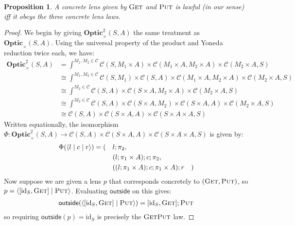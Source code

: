 \documentclass[11pt,letterpaper]{article}
\theoremstyle{plain}
\newtheorem{proposition}[theorem]{Proposition}
\theoremstyle{definition}
\newcommand{\C}{\mathscr{C}}
\newcommand{\Optic}{\mathbf{Optic}}
\newcommand{\Twoptic}{\mathbf{Optic}^2}
\newcommand{\conctwice}{\mathbb{C}^2}
\newcommand{\id}{\mathrm{id}}
\newcommand{\rep}[2]{{\ensuremath \left\langle #1 \mid #2 \right\rangle}}
\newcommand{\repthree}[3]{{\ensuremath \langle #1 \mid #2 \mid #3 \rangle}}
\newcommand{\fget}{\textsc{Get}}
\newcommand{\fput}{\textsc{Put}}
\newcommand{\outside}{\mathsf{outside}}
\begin{document}
\begin{proposition}\label{prop:lawful-lens-laws}
  A concrete lens given by $\fget$ and $\fput$ is lawful (in our sense) iff it obeys the three concrete lens laws.
\end{proposition}
\begin{proof}
  We begin by giving $\Twoptic_\times(S, A)$ the same treatment as $\Optic_\times(S, A)$. Using the universal property of the product and Yoneda reduction twice each, we have:
  \begin{align*}
  \Twoptic_\times(S, A)
  &= \int^{M_1, M_2 \in \C} \C(S, M_1 \times A) \times \C(M_1 \times A, M_2 \times A) \times \C(M_2 \times A, S) \\
  &\cong \int^{M_1, M_2 \in \C} \C(S, M_1) \times \C(S, A) \times \C(M_1 \times A, M_2 \times A) \times \C(M_2 \times A, S) \\
  &\cong \int^{M_2 \in \C} \C(S, A) \times \C(S \times A, M_2 \times A) \times \C(M_2 \times A, S) \\
  &\cong \int^{M_2 \in \C} \C(S, A) \times \C(S \times A, M_2) \times \C(S \times A, A) \times \C(M_2 \times A, S) \\
  &\cong \C(S, A) \times \C(S \times A, A) \times \C(S \times A \times A, S)
  \end{align*}
  Written equationally, the isomorphism $\Phi : \Twoptic_\times(S, A) \to \C(S, A) \times \C(S \times A, A) \times \C(S \times A \times A, S)$ is given by:
  \begin{align*}
    \Phi(\repthree{l}{c}{r}) = (\quad&l;\pi_2, \\
                                       &(l;\pi_1 \times A);c;\pi_2, \\
                                       &((l;\pi_1 \times A);c;\pi_1 \times A);r \quad )
  \end{align*}
  Now suppose we are given a lens $p$ that corresponds concretely to $(\fget, \fput)$, so $p = \rep{[\id_S, \fget]}{\fput}$. Evaluating $\outside$ on this gives:
  \begin{align*}
    \outside(\rep{[\id_S, \fget]}{\fput}) = [\id_S, \fget];\fput 
  \end{align*}
  so requiring $\outside(p) = \id_S$ is precisely the $\fget\fput$ law.


\end{proof}
\end{document}
